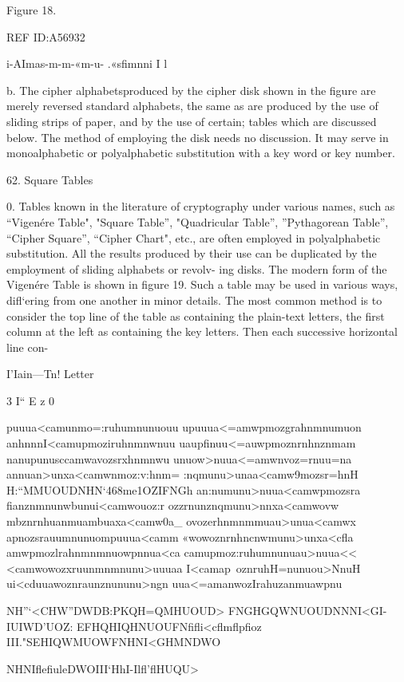 {Figure 18.

 

 

 

REF ID:A56932

i-AImas-m-m-«m-u- .«sﬁmnni I l

b. The cipher alphabetsproduced by the cipher disk shown in the
ﬁgure are merely reversed standard alphabets, the same as are produced
by the use of sliding strips of paper, and by the use of certain; tables
which are discussed below. The method of employing the disk needs no
discussion. It may serve in monoalphabetic or polyalphabetic substitution
with a key word or key number.

62. Square Tables

0. Tables known in the literature of cryptography under various
names, such as “Vigenére Table", "Square Table”, "Quadricular Table”,
”Pythagorean Table”, “Cipher Square”, “Cipher Chart", etc., are often
employed in polyalphabetic substitution. All the results produced by their
use can be duplicated by the employment of sliding alphabets or revolv-
ing disks. The modern form of the Vigenére Table is shown in ﬁgure 19.
Such a table may be used in various ways, diﬂ‘ering from one another in
minor details. The most common method is to consider the top line of
the table as containing the plain-text letters, the ﬁrst column at the left
as containing the key letters. Then each successive horizontal line con-

I’Iain—Tn! Letter

3
I“
E
z
0

 

puuua<camunmo=:ruhumnunuouu
upuuua<=amwpmozgrahnmnumuon
anhnnnI<camupmoziruhnmnwnuu
uaupﬁnuu<=auwpmoznrnhnznmam
nanupunusccamwavozsrxhnmnwu
unuow>nuua<=amwnvoz=rnuu=na
annuan>unxa<camwnmoz:v:hnm=
:nqmunu>unaa<camw9mozsr=hnH
H:“MMUOUDNHN‘468me1OZIFNGh
an:numunu>nuua<camwpmozsra
ﬁanznmnunwbunui<camwouoz:r
ozzrnunznqmunu>nnxa<camwovw
mbznrnhuanmuambuaxa<camw0a_
ovozerhnmnmmuau>unua<camwx
apnozsrauumnunuompuuua<camm
«wowoznrnhncnwmunu>unxa<cﬂa
amwpmozlrahnmnmnuowpnnua<ca
camupmoz:ruhumnunuau>nuua<<
<camwowozxruunmnmnunu>uuuaa
I<camap~oznruhH=nunuou>NnuH
ui<cduuawoznraunznununu>ngn
uua<=amanwozIrahuzanmuawpnu

 

NH”‘<CHW”DWDB:PKQH=QMHUOUD>
FNGHGQWNUOUDNNNI<GI-IUIWD'UOZ:
EFHQHIQHNUOUFNﬁﬂi<cﬂmﬂpﬁoz
III."SEHIQWMUOWFNHNI<GHMNDWO

 

NHNIﬂeﬁuleDWOIII‘HhI-Ilﬂ'ﬂHUQU>

}
